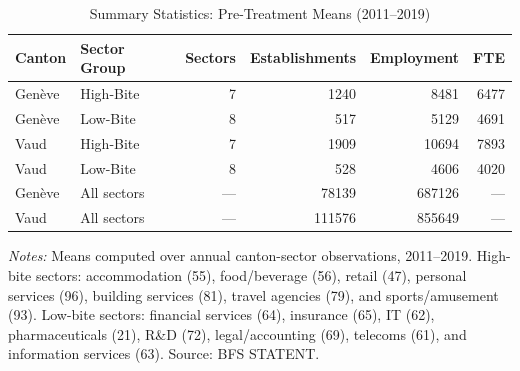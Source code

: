\begin{table}[htbp]
\centering
\caption{Summary Statistics: Pre-Treatment Means (2011--2019)}
\label{tab:summary}
\begin{threeparttable}
\begin{tabular}{llrrrr}
\toprule
Canton & Sector Group & Sectors & Establishments & Employment & FTE \\
\midrule
Genève & High-Bite & 7 & 1240 & 8481 & 6477 \\
Genève & Low-Bite & 8 & 517 & 5129 & 4691 \\
Vaud & High-Bite & 7 & 1909 & 10694 & 7893 \\
Vaud & Low-Bite & 8 & 528 & 4606 & 4020 \\
\midrule
Genève & All sectors & --- & 78139 & 687126 & --- \\
Vaud & All sectors & --- & 111576 & 855649 & --- \\
\bottomrule
\end{tabular}
\begin{tablenotes}[flushleft]
\small
\item \textit{Notes:} Means computed over annual canton-sector observations, 2011--2019.
High-bite sectors: accommodation (55), food/beverage (56), retail (47), personal services (96),
building services (81), travel agencies (79), and sports/amusement (93).
Low-bite sectors: financial services (64), insurance (65), IT (62), pharmaceuticals (21),
R\&D (72), legal/accounting (69), telecoms (61), and information services (63).
Source: BFS STATENT.
\end{tablenotes}
\end{threeparttable}
\end{table}
